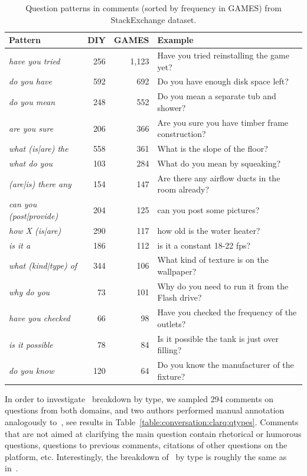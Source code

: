 \begin{table}[h!]
	\centering
	\small
	\begin{tabular}[t]{p{4cm}rrp{5.5cm}}
		\textbf{Pattern} & \textbf{DIY} & \textbf{GAMES} & \textbf{Example} \\
		\hline
		\textit{have you tried}& 256 & 1,123 & Have you tried reinstalling the game yet?\\
		\textit{do you have}                 & 592 & 692 & Do you have enough disk space left?\\
		\textit{do you mean}                 & 248 & 552 & Do you mean a separate tub and shower? \\
		\textit{are you sure}                & 206 & 366 & Are you sure you have timber frame construction? \\
		\textit{what (is|are) the}             & 558 & 361 & What is the slope of the floor? \\
		\textit{what do you}                 & 103 & 284 & What do you mean by squeaking?\\
		\textit{(are|is) there any}            & 154 & 147 & Are there any airflow ducts in the room already?\\
		\textit{can you (post|provide)}     & 204 & 125 & can you post some pictures? \\
		\textit{how X (is|are)}                & 290 & 117 & how old is the water heater? \\
		\textit{is it a}                     & 186 & 112 & is it a constant 18-22 fps?\\
		\textit{what (kind|type) of}         & 344 & 106 & What kind of texture is on the wallpaper? \\
		\textit{why do you}                 &  73 & 101 & Why do you need to run it from the Flash drive?\\
		\textit{have you checked}             &  66 &  98 & Have you checked the frequency of the outlets? \\
		\textit{is it possible}             &  78 &  84 & Is it possible the tank is just over filling? \\
		\textit{do you know}                 & 120 &  64 & Do you know the manufacturer of the fixture?\\
	\end{tabular}
	\caption{Question patterns in comments (sorted by frequency in GAMES) from StackExchange dataset.}
	\label{table:conversation:clarq:patterns}
\end{table}


In order to investigate \clarQ~breakdown by type, we sampled 294 comments on questions from both domains, and two authors performed manual annotation analogously to~\cite{kato2013}, see results in Table~\ref{table:conversation:clarq:qtypes}.
Comments that are not aimed at clarifying the main question contain rhetorical or humorous questions,
questions to previous comments, citations of other questions on the platform, etc. Interestingly, the breakdown of \clarQ~by type is roughly the same as in~\cite{kato2013}.

